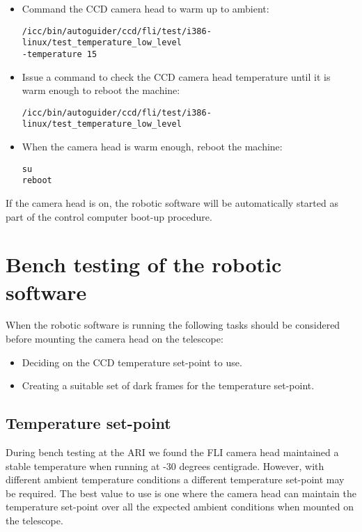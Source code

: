 \documentclass[10pt,a4paper]{article}
\begin{document}
\begin{itemize}
\item Command the CCD camera head to warm up to ambient:
\begin{verbatim}
/icc/bin/autoguider/ccd/fli/test/i386-linux/test_temperature_low_level 
-temperature 15
\end{verbatim}
\item Issue a command to check the CCD camera head temperature until it is warm enough to reboot the machine:
\begin{verbatim}
/icc/bin/autoguider/ccd/fli/test/i386-linux/test_temperature_low_level 
\end{verbatim}
\item When the camera head is warm enough, reboot the machine:
\begin{verbatim}
su
reboot
\end{verbatim}
\end{itemize}

If the camera head is on, the robotic software will be automatically started as part of the control computer boot-up procedure.

\section{Bench testing of the robotic software}

When the robotic software is running the following tasks should be considered before mounting the camera head on the telescope:

\begin{itemize}
\item Deciding on the CCD temperature set-point to use.
\item Creating a suitable set of dark frames for the temperature set-point.
\end{itemize}

\subsection{Temperature set-point}

During bench testing at the ARI we found the FLI camera head maintained a stable temperature when running at -30 degrees centigrade. However, with different ambient temperature conditions a different temperature set-point may be required. The best value to use is one where the camera head can maintain the temperature set-point over all the expected ambient conditions when mounted on the telescope.
\end{document}
